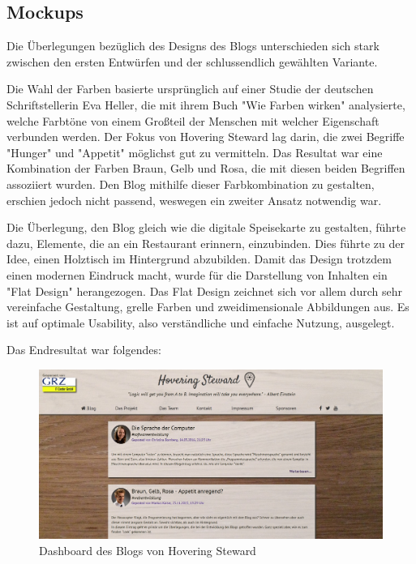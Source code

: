     \subsection*{Mockups}
    Die Überlegungen bezüglich des Designs des Blogs unterschieden sich stark zwischen den ersten
    Entwürfen und der schlussendlich gewählten Variante.

    Die Wahl der Farben basierte ursprünglich auf einer Studie der deutschen Schriftstellerin Eva Heller,
    die mit ihrem Buch {"Wie Farben wirken"\cite{WieFarbenWirken}} analysierte, welche Farbtöne von einem Großteil der Menschen
    mit welcher Eigenschaft verbunden werden. Der Fokus von Hovering Steward lag darin, die zwei Begriffe "Hunger"
    und "Appetit" möglichst gut zu vermitteln. Das Resultat war eine Kombination der Farben Braun, Gelb und Rosa, die mit diesen beiden Begriffen
    assoziiert wurden. Den Blog mithilfe dieser Farbkombination zu gestalten, erschien jedoch nicht passend, weswegen
    ein zweiter Ansatz notwendig war.

    Die Überlegung, den Blog gleich wie die digitale Speisekarte zu gestalten, führte dazu, Elemente, die an ein Restaurant
    erinnern, einzubinden. Dies führte zu der Idee, einen Holztisch im Hintergrund abzubilden.
    Damit das Design trotzdem einen modernen Eindruck macht, wurde für die Darstellung von Inhalten ein {"Flat Design"\cite{FlatDesign}}
    herangezogen. Das Flat Design zeichnet sich vor allem durch sehr vereinfache Gestaltung, grelle Farben und zweidimensionale Abbildungen aus.
    Es ist auf optimale Usability, also verständliche und einfache Nutzung, ausgelegt.

    Das Endresultat war folgendes:

    \begin{figure}[H]
      \begin{centering}
      \includegraphics[width = 1\textwidth]{Bilder/blog_dashboard.jpg}
      \par\end{centering}
      \caption{Dashboard des Blogs von Hovering Steward}
      \label{blog}
    \end{figure}

